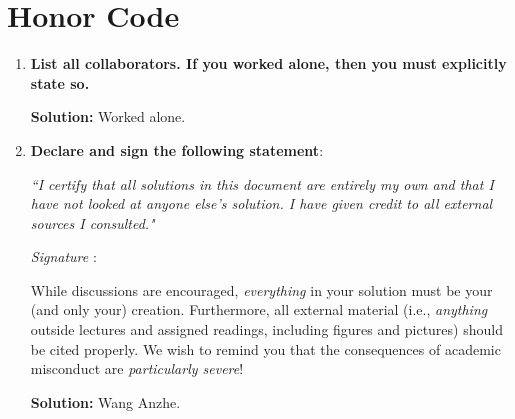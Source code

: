 \documentclass{article}
\newcommand{\Question}[1]{\Large \section{ #1 } \normalsize}
\newenvironment{solution}{\color{blue} \smallskip \textbf{Solution:}}{}
\begin{document}
\newpage
\Question{Honor Code}

\begin{enumerate}
    \item 
    \textbf{List all collaborators. If you worked alone, then you must explicitly state so.}

    \begin{solution}
        Worked alone.
    \end{solution}

    \item
    \textbf{Declare and sign the following statement}: 
    
    \textit{``I certify that all solutions in this document are entirely my own and that I have not looked at anyone else's solution. I have given credit to all external sources I consulted."}
    
    \textit{Signature} : \hrulefill
    
    While discussions are encouraged, \emph{everything} in your solution must be your (and only your) creation. 
    Furthermore, all external material  (i.e., \emph{anything} outside lectures and assigned
    readings, including figures and pictures) should be cited properly.
    We wish to remind you that the consequences of academic misconduct are \emph{particularly severe}!

    \begin{solution}
        Wang Anzhe.
    \end{solution}

\end{enumerate}
\end{document}
